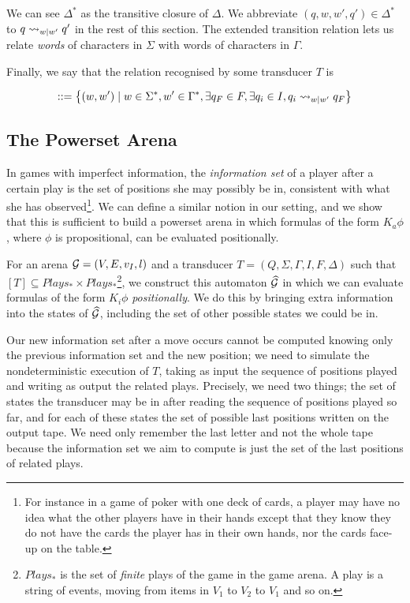 \documentclass[10pt, a4paper]{report}
\begin{document}
We can see $\Delta^\ast$ as the transitive closure of $\Delta$. We abbreviate
$(q, w, w', q') \in \Delta^\ast$ to $q \rightsquigarrow_{w \mid w'} q'$ in the rest of
this section. The extended transition relation lets us relate \emph{words} of
characters in $\Sigma$ with words of characters in $\Gamma$. 

Finally, we say that the relation recognised by some transducer $T$ is

\begin{align*}
  [T] ::= \left\{ (w, w') \mid w \in \Sigma^\ast, w' \in \Gamma^\ast, \exists q_F \in F, \exists q_i \in I, q_i \rsarrow_{w \mid w'} q_F \right\}
\end{align*}

\subsection{The Powerset Arena}
\label{sec:PowersetArena}

In games with imperfect information, the \emph{information set} of a player after a
certain play is the set of positions she may possibly be in, consistent with
what she has observed\footnote{For instance in a game of poker with one deck of cards, a
player may have no idea what the other players have in their hands except that
they know they do not have the cards the player has in their own hands, nor the
cards face-up on the table.}. We can define a similar notion in our setting, and
we show that this is sufficient to build a powerset arena in which formulas of
the form $K_a \phi$, where $\phi$ is propositional, can be evaluated positionally. 

For an arena $\mathcal{G} = (V, E, v_I, l)$ and a transducer $T = (Q, \Sigma, \Gamma,
I, F, \Delta)$ such that $[T] \subseteq Plays_\ast \times
Plays_\ast$\footnote{$Plays_\ast$ is the set of \emph{finite} plays of the game
  in the game arena. A play is a string of events, moving from items in $V_1$ to
  $V_2$ to $V_1$ and so on.}, we construct this automaton $\widehat{\mathcal{G}}$ in
which we can evaluate formulas of the form $K_i \phi$ \emph{positionally}. We do
this by bringing extra information into the states of $\widehat{\mathcal{G}}$, including
the set of other possible states we could be in.

Our new information set after a move occurs cannot be computed knowing only the
previous information set and the new position; we need to simulate the
nondeterministic execution of $T$, taking as input the sequence of positions
played and writing as output the related plays. Precisely, we need two things;
the set of states the transducer may be in after reading the sequence of
positions played so far, and for each of these states the set of possible last
positions written on the output tape. We need only remember the last letter and
not the whole tape because the information set we aim to compute is just the set
of the last positions of related plays.
\end{document}

